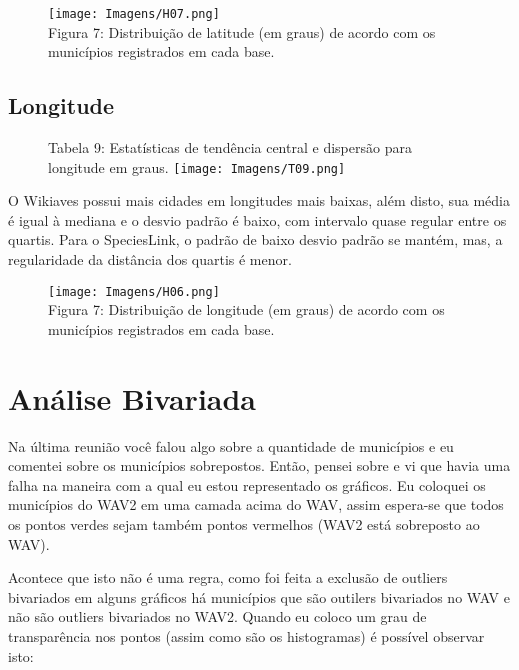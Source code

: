 \documentclass[12pt]{extarticle}
\newenvironment{resposta}{ \color{mygray}}{}
\begin{document}
\begin{figure}[h!]
\centering
\texttt{[image: Imagens/H07.png]}
\\{\scriptsize Figura 7: Distribuição de latitude (em graus) de acordo com os municípios registrados em cada base.}
\end{figure}

\newpage

\subsection{Longitude}


\begin{figure}[h!]
\centering
{\scriptsize Tabela 9: Estatísticas de tendência central e dispersão para longitude em graus.}
\texttt{[image: Imagens/T09.png]}
\end{figure}

\begin{resposta}
O Wikiaves possui mais cidades em longitudes mais baixas, além disto, sua média é igual à mediana e o desvio padrão é baixo, com intervalo quase regular entre os quartis. Para o SpeciesLink, o padrão de baixo desvio padrão se mantém, mas, a regularidade da distância dos quartis é menor.
\end{resposta}


\begin{figure}[h!]
\centering
\texttt{[image: Imagens/H06.png]}
\\{\scriptsize Figura 7: Distribuição de longitude (em graus) de acordo com os municípios registrados em cada base.}
\end{figure}

\newpage

\section{Análise Bivariada}

\hrulefill

Na última reunião você falou algo sobre a quantidade de municípios e eu comentei sobre os municípios sobrepostos. Então, pensei sobre e vi que havia uma falha na maneira com a qual eu estou representado os gráficos. Eu coloquei os municípios do WAV2 em uma camada acima do WAV, assim espera-se que todos os pontos verdes sejam também pontos vermelhos (WAV2 está sobreposto ao WAV). 

Acontece que isto não é uma regra, como foi feita a exclusão de outliers bivariados em alguns gráficos há municípios que são outilers bivariados no WAV e não são outliers bivariados no WAV2. Quando eu coloco um grau de transparência nos pontos (assim como são os histogramas) é possível observar isto:
\end{document}
